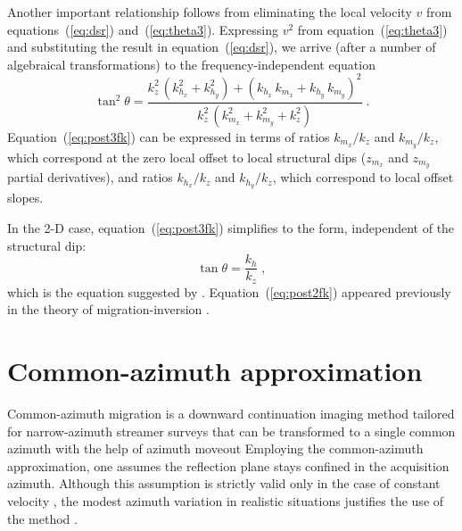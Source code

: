 Another important relationship follows from eliminating the local velocity $v$
from equations~(\ref{eq:dsr}) and~(\ref{eq:theta3}). Expressing $v^2$ from
equation~(\ref{eq:theta3}) and substituting the result in
equation~(\ref{eq:dsr}), we arrive (after a number of algebraical
transformations) to the frequency-independent equation
\begin{equation}
  \label{eq:post3fk}
  \boxed{
  \tan^2{\theta} = \frac{
    k_z^2\,\left(k_{h_x}^2 + k_{h_y}^2\right) +
    \left(k_{h_x}\,k_{m_x} + k_{h_y}\,k_{m_y}\right)^2}
  {k_z^2\,\left(k_{m_x}^2 + k_{m_y}^2 + k_z^2\right)}\;.
  }
\end{equation}
Equation~(\ref{eq:post3fk}) can be expressed in terms of ratios $k_{m_x}/k_z$
and $k_{m_y}/k_z$, which correspond at the zero local offset to local
structural dips ($z_{m_x}$ and $z_{m_y}$ partial derivatives), and ratios
$k_{h_x}/k_z$ and $k_{h_y}/k_z$, which correspond to local offset slopes. 

In the 2-D case, equation~(\ref{eq:post3fk}) simplifies to the form,
independent of the structural dip:
\begin{equation}
  \label{eq:post2fk}
  \tan{\theta} = \frac{k_h}{k_z}\;,
\end{equation}
which is the equation suggested by \cite{GEO68-03-10651074}.
Equation~(\ref{eq:post2fk}) appeared previously in the theory of
migration-inversion \cite[]{GEO50-12-24582472}.

\section{Common-azimuth approximation}

Common-azimuth migration \cite[]{GEO61-06-18221832} is a downward continuation
imaging method tailored for narrow-azimuth strea\-mer surveys that can be
transformed to a single common azimuth with the help of azimuth moveout
\cite[]{GEO63-02-05740588} Employing the common-azimuth approximation, one
assumes the reflection plane stays confined in the acquisition azimuth.
Although this assumption is strictly valid only in the case of constant
velocity \cite[]{Vaillant.sep.103.louis1}, the modest azimuth variation in
realistic situations justifies the use of the method \cite[]{naraz}. 
 
